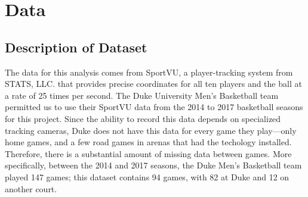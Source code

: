 \documentclass[12pt,twoside]{dukestatscithesis}
\title{}
\author{}
\date{}
\theoremstyle{definition}
\theoremstyle{definition}
\theoremstyle{definition}
\theoremstyle{remark}
\begin{document}

\frontmatter %
\pagestyle{empty} %



  \hypersetup{linkcolor=black}
  \setcounter{tocdepth}{2}
  \tableofcontents





\mainmatter %
\pagestyle{fancyplain} %

\chapter{Data}\label{data}

\section{Description of Dataset}\label{description-of-dataset}

The data for this analysis comes from SportVU, a player-tracking system
from STATS, LLC. that provides precise coordinates for all ten players
and the ball at a rate of 25 times per second. The Duke University Men's
Basketball team permitted us to use their SportVU data from the 2014 to
2017 basketball seasons for this project. Since the ability to record
this data depends on specialized tracking cameras, Duke does not have
this data for every game they play---only home games, and a few road
games in arenas that had the techology installed. Therefore, there is a
substantial amount of missing data between games. More specifically,
between the 2014 and 2017 seasons, the Duke Men's Basketball team played
147 games; this dataset contains 94 games, with 82 at Duke and 12 on
another court.
\end{document}
